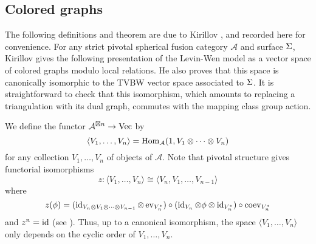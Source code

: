 \newcommand{\ee}{\mathbf{e}}       %
\newcommand{\A}{\mathcal{A}}      %
\newcommand{\st}{\; | \;}                               %
\newcommand{\ttt}{\otimes}                              %
\newcommand{\cc}[1]{\underset{\scriptstyle #1}{\circ}}
\newcommand{\ccc}[1]{\underset{\scriptstyle #1}{\bullet}}
\newcommand{\ti}{\tilde}
\newcommand{\ov}{\overline}
\newcommand{\del}{\partial}
\newcommand{\<}{\langle}
\renewcommand{\>}{\rangle}
\newcommand{\surjto}{\twoheadrightarrow}      %
\newcommand{\injto}{\hookrightarrow}          %
\newcommand{\isoto}{\xrightarrow {\sim}}       %
\newcommand{\xxto}{\xrightarrow}              %
\newcommand{\firef}[1]{Figure~{\rm\ref{#1}}}
\newcommand{\R}{\mathbb{R}}       %


\subsection{Colored graphs}\label{s:colored}

The following definitions and theorem are due to Kirillov
\cite{kirillovStringNets}, and recorded here for convenience.  For any
strict pivotal spherical fusion category $\mathcal A$ and surface $\Sigma$,
Kirillov gives the
following presentation of the Levin-Wen model as a vector space of
colored graphs modulo local relations.  He also proves that this space
is canonically isomorphic to the TVBW vector space associated to
$\Sigma$.  It is straightforward to check that this isomorphism, which
amounts to replacing a triangulation with its dual graph, commutes
with the mapping class group action.


We define the functor $\A^{\boxtimes n}\to \Vect$ by
\begin{equation}\label{e:vev}
\<V_1,\dots,V_n\>=\Hom_\A(\one,
V_1\otimes\dots\otimes V_n)
\end{equation}
for any collection $V_1,\dots, V_n$ of objects of $\A$. Note that pivotal
structure gives functorial isomorphisms
\begin{equation}\label{e:cyclic}
z\colon\<V_1,\dots,V_n\>\cong \<V_n, V_1,\dots,V_{n-1}\>
\end{equation}
where
$$z(\phi)= ( \operatorname{id}_{V_n \otimes V_1 \otimes \cdots \otimes V_{n-1}} \otimes \operatorname{ev}_{V_n^*} ) \circ (\operatorname{id}_{V_n} \otimes \phi \otimes \operatorname{id}_{V_n^*} ) \circ  \operatorname{coev}_{V_n^*}  $$ 
and $z^n=\operatorname{id}$ (see \cite[Section 5.3]{BK}). Thus, up to a canonical
isomorphism, the space $\<V_1,\dots,V_n\>$ only depends on the cyclic order
of $V_1,\dots, V_n$.

